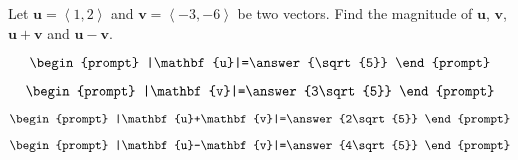 \documentclass{ximera}
\author{Gregory Hartman \and Matthew Carr}
\begin{document}
\begin{exercise}




Let $\mathbf{u}=\left\langle1,2\right\rangle$ and $\mathbf{v}=\left\langle-3,-6\right\rangle$ be two vectors. Find the magnitude of $\mathbf{u}$, $\mathbf{v}$, $\mathbf{u}+\mathbf{v}$ and $\mathbf{u}-\mathbf{v}$.

\[
\begin{prompt}
|\mathbf{u}|=\answer{\sqrt{5}}
\end{prompt}
\]

\[
\begin{prompt}
|\mathbf{v}|=\answer{3\sqrt{5}}
\end{prompt}
\]

\[
\begin{prompt}
|\mathbf{u}+\mathbf{v}|=\answer{2\sqrt{5}}
\end{prompt}
\]

\[
\begin{prompt}
|\mathbf{u}-\mathbf{v}|=\answer{4\sqrt{5}}
\end{prompt}
\]


\end{exercise}
\end{document}
